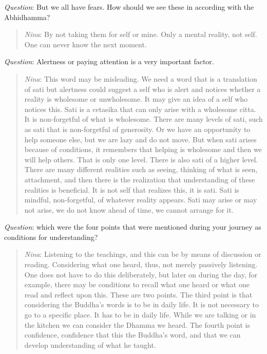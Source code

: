 \documentclass[10pt,a4paper,oneside]{article}
\begin{document}
\textit{Question}: But we all have fears. How should we see these in according with the Abhidhamma?

\begin{quote}

\textit{Nina}: By not taking them for self or mine. Only a mental reality, not self. One can never know the next moment. 
\end{quote}

\textit{Question}: Alertness or paying attention is a very important factor.

\begin{quote}

\textit{Nina}: This word may be misleading. We need a word that is a translation of sati but alertness could suggest a self who is alert and notices whether a reality is wholesome or unwholesome. It may give an idea of a self who notices this. Sati is a cetasika that can only arise with a wholesome citta. It is non-forgetful of what is wholesome. There are many levels of sati, such as sati that is non-forgetful of generosity. Or we have an opportunity to help someone else, but we are lazy and do not move. But when sati arises because of conditions, it remembers that helping is wholesome and then we will help others. That is only one level. There is also sati of a higher level. There are many different realities such as seeing, thinking of what is seen, attachment, and then there is the realization that understanding of these realities is beneficial. It is not self that realizes this, it is sati. Sati is mindful, non-forgetful, of whatever reality appears. Sati may arise or may not arise, we do not know ahead of time, we cannot arrange for it. 
\end{quote}

\textit{Question}: which were the four points that were mentioned during your journey as conditions for understanding?

\begin{quote}

\textit{Nina}: Listening to the teachings, and this can be by means of discussion or reading. Considering what one heard, thus, not merely passively listening. One does not have to do this deliberately, but later on during the day, for example, there may be conditions to recall what one heard or what one read and reflect upon this. These are two points. The third point is that considering the Buddha’s words is to be in daily life. It is not necessary to go to a specific place. It has to be in daily life. While we are talking or in the kitchen we can consider the Dhamma we heard. The fourth point is confidence, confidence that this the Buddha’s word, and that we can develop understanding of what he taught. 
\end{quote}
\end{document}
